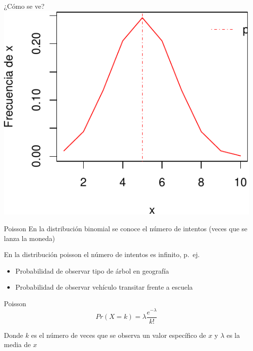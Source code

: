 \documentclass[
  11pt,
  ignorenonframetext,
]{beamer}
\providecommand{\tightlist}{%
  \setlength{\itemsep}{0pt}\setlength{\parskip}{0pt}}
\begin{document}
\begin{frame}{¿Cómo se ve?}
\protect\hypertarget{cuxf3mo-se-ve-1}{}
\includegraphics{Distribuciones_files/figure-beamer/unnamed-chunk-3-1.pdf}
\end{frame}

\begin{frame}{Poisson}
\protect\hypertarget{poisson}{}
En la distribución binomial se conoce el número de intentos (veces que
se lanza la moneda)

En la distribución poisson el número de intentos es infinito, p.~ej.

\begin{itemize}
\tightlist
\item
  Probabilidad de observar tipo de árbol en geografía
\item
  Probabilidad de observar vehículo transitar frente a escuela
\end{itemize}
\end{frame}

\begin{frame}{Poisson}
\protect\hypertarget{poisson-1}{}
\begin{equation}
Pr(X = k) = \lambda \frac{e^{-\lambda}}{k!}
\end{equation}

Donde \(k\) es el número de veces que se observa un valor específico de
\(x\) y \(\lambda\) es la media de \(x\)
\end{frame}
\end{document}

